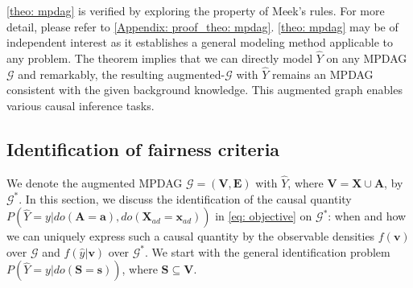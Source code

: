 \documentclass{article} %
\newtheorem{corollary}{Corollary}[section]
\begin{document}
\cref{theo: mpdag} is verified by exploring the property of Meek's rules. For more detail, please refer to \cref{Appendix: proof_theo: mpdag}. 
\cref{theo: mpdag} may be of independent interest as it establishes a general modeling method applicable to any problem. The theorem implies that we can directly model $\hat{Y}$ on any MPDAG $\mathcal{G}$ and remarkably, the resulting augmented-$\mathcal{G}$ with $\hat{Y}$ remains an MPDAG consistent with the given background knowledge. This augmented graph enables various causal inference tasks.





\subsection{Identification of fairness criteria}\label{sec: identification}
We denote the augmented MPDAG $\mathcal{G}=(\mathbf{V}, \mathbf{E})$ with $\hat{Y}$, where $\mathbf{V}=\mathbf{X} \cup \mathbf{A}$, by $\mathcal{G^{*}}$. In this section, we discuss the identification of the causal quantity $P(\hat{Y}=y|do(\mathbf{A}=\mathbf{a}), do(\mathbf{X}_{ad}=\mathbf{x}_{ad}))$ in \cref{eq: objective} on $\mathcal{G^{*}}$: when and how we can uniquely express such a causal quantity by the observable densities $f(\mathbf{v})$ over $\mathcal{G}$ and $f(\hat{y}|\mathbf{v})$ over $\mathcal{G^*}$. We start with the general identification problem $P(\hat{Y}=y|do(\mathbf{S}=\mathbf{s}))$, where 
$\mathbf{S} \subseteq \mathbf{V}$.
\end{document}
